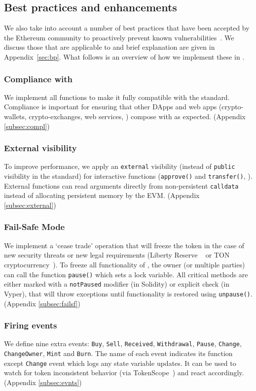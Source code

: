 \subsection{Best practices and enhancements}
We also take into account a number of best practices that have been accepted by the Ethereum community to proactively prevent known vulnerabilities~\cite{TokenBP}. We discuss those that are applicable to \erc and brief explanation are given in  Appendix~\ref{sec:bp}. What follows is an overview of how we implement these in \sys. 

\subsubsection{Compliance with \erc}
We implement all \erc functions to make it fully compatible with the standard. Compliance is important for ensuring that other DApps and web apps (\ie crypto-wallets, crypto-exchanges, web services, \etc) compose with \sys as expected. (\cf Appendix \ref{subsec:compl})

\subsubsection{External visibility}
To improve performance, we apply an \texttt{external} visibility (instead of \texttt{public} visibility in the standard) for interactive functions (\eg \texttt{approve()} and \texttt{transfer()}, \etc).  External functions can read arguments directly from non-persistent \texttt{calldata} instead of allocating persistent memory by the EVM. (\cf Appendix \ref{subsec:external})

\subsubsection{Fail-Safe Mode}
We implement a `cease trade' operation that will freeze the token in the case of new security threats or new legal requirements (\eg Liberty Reserve ~\cite{LibertyReserve} or TON cryptocurrency~\cite{TON}). To freeze all functionality of \sys, the owner (or multiple parties) can call the function \texttt{pause()} which sets a lock variable. All critical methods are either marked with a \texttt{notPaused} modifier (in Solidity) or explicit check (in Vyper), that will throw exceptions until functionality is restored using \texttt{unpause()}. (\cf Appendix \ref{subsec:failsf})

\subsubsection{Firing events}
We define nine extra events: \texttt{Buy}, \texttt{Sell}, \texttt{Received}, \texttt{Withdrawal}, \texttt{Pause}, \texttt{Change}, \texttt{ChangeOwner}, \texttt{Mint} and \texttt{Burn}. The name of each event indicates its function except \texttt{Change} event which logs any state variable updates. It can be used to watch for token inconsistent behavior (\eg via TokenScope~\cite{TokenScope}) and react accordingly. (\cf Appendix \ref{subsec:evnts})
	
